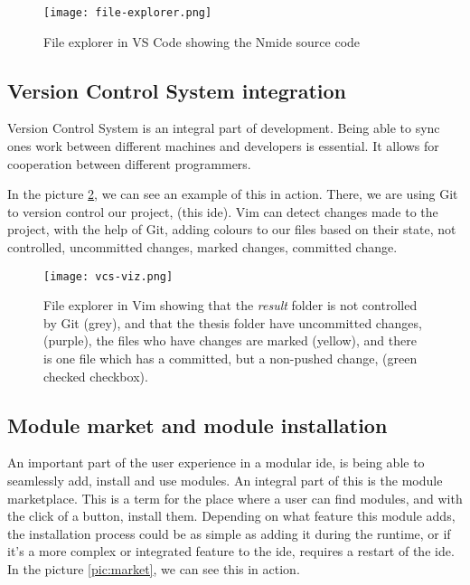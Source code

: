 \begin{figure}
  \centering
  \texttt{[image: file-explorer.png]}
  \caption{File explorer in VS Code showing the Nmide source code}
  \label{pic:fileEx}
\end{figure}

\subsection{Version Control System integration}

Version Control System is an integral part of development. Being able to sync
ones work between different machines and developers is essential. It allows for
cooperation between different programmers.

In the picture \ref{pic:vcsViz}, we can see an example of this in action. There,
we are using Git to version control our project, (this \gls*{ide}). Vim
can detect changes made to the project, with the help of Git, adding colours to
our files based on their state, not controlled, uncommitted changes, marked
changes, committed change.

\begin{figure}
  \centering
  \texttt{[image: vcs-viz.png]}
  \caption{
    File explorer in Vim showing that the \textit{result} folder is not
    controlled by Git (grey), and that the thesis folder have uncommitted
    changes, (purple), the files who have changes are marked (yellow), and there
    is one file which has a committed, but a non-pushed change, (green checked
    checkbox).
  }
  \label{pic:vcsViz}
\end{figure}

\subsection{Module market and module installation}

An important part of the user experience in a modular \gls*{ide}, is being able
to seamlessly add, install and use modules. An integral part of this is the
module marketplace. This is a term for the place where a user can find modules,
and with the click of a button, install them. Depending on what feature this
module adds, the installation process could be as simple as adding it during the
runtime, or if it's a more complex or integrated feature to the \gls*{ide},
requires a restart of the \gls*{ide}. In the picture \ref{pic:market}, we can see
this in action.

